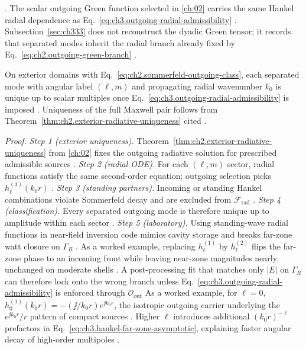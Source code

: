 \cite{harrington2001}.
The scalar outgoing Green function selected in \ref{ch:02} carries the same Hankel radial dependence as
Eq.~\eqref{eq:ch3.outgoing-radial-admissibility} \cite{stratton1941}. Subsection~\ref{sec:ch333}
does not reconstruct the dyadic Green tensor; it records that separated modes inherit the radial branch already
fixed by Eq.~\eqref{eq:ch2.outgoing-green-branch} \cite{harrington2001}.
\begin{theorem}
\label{thm:ch3.radial-outgoing-uniqueness-class}
On exterior domains with Eq.~\eqref{eq:ch2.sommerfeld-outgoing-class}, each separated mode with angular label
\((\ell,m)\) and propagating radial wavenumber \(k_{0}\) is unique up to scalar multiples once
Eq.~\eqref{eq:ch3.outgoing-radial-admissibility} is imposed \cite{stratton1941}. Uniqueness of
the full Maxwell pair follows from Theorem~\ref{thm:ch2.exterior-radiative-uniqueness} cited
\cite{stratton1941}.
\end{theorem}
\noindent\textit{Proof.}
\emph{Step 1 (exterior uniqueness).} Theorem~\ref{thm:ch2.exterior-radiative-uniqueness} from \ref{ch:02} fixes the outgoing radiative solution for prescribed admissible sources .
\emph{Step 2 (radial ODE).} For each \((\ell,m)\) sector, radial functions satisfy the same second-order equation; outgoing selection picks \(h_{\ell}^{(1)}(k_0 r)\) .
\emph{Step 3 (standing partners).} Incoming or standing Hankel combinations violate Sommerfeld decay and are excluded from \(\mathcal{F}_{\mathrm{rad}}\) .
\emph{Step 4 (classification).} Every separated outgoing mode is therefore unique up to amplitude within each sector .
\emph{Step 5 (laboratory).} Using standing-wave radial functions in near-field inversion code mimics cavity storage and breaks far-zone watt closure on \(\Gamma_R\) .
As a worked example, replacing \(h_{\ell}^{(1)}\) by \(h_{\ell}^{(2)}\) flips the far-zone phase to an incoming front while leaving
near-zone magnitudes nearly unchanged on moderate shells . A post-processing fit
that matches only \(|E|\) on \(\Gamma_{R}\) can therefore lock onto the wrong branch unless
Eq.~\eqref{eq:ch3.outgoing-radial-admissibility} is enforced through \(\mathcal{O}_{\mathrm{out}}\)
As a worked example, for \(\ell=0\), \(h_{0}^{(1)}(k_{0}r)=-(\jj/k_{0}r)e^{\jj k_{0}r}\), the isotropic outgoing carrier underlying
the \(e^{\jj k_{0}r}/r\) pattern of compact sources . Higher \(\ell\) introduces additional
\((k_{0}r)^{-\ell}\) prefactors in Eq.~\eqref{eq:ch3.hankel-far-zone-asymptotic}, explaining faster angular
decay of high-order multipoles .
